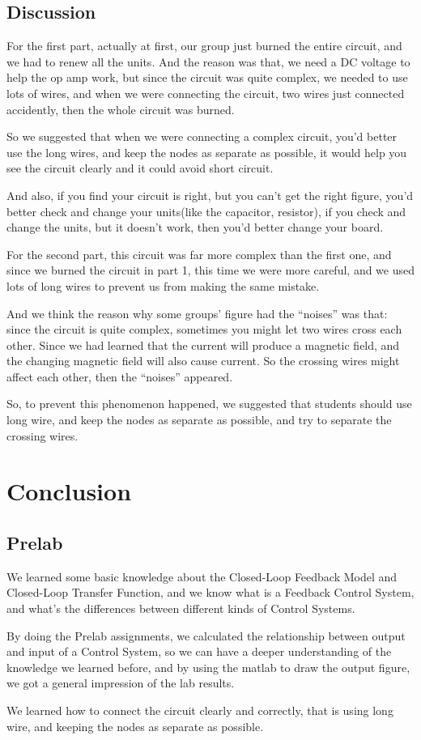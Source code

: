 \documentclass[12pt]{article}
\begin{document}
\subsection{Discussion}
For the first part, actually at first, our group just burned the entire circuit, and we had to renew all the units. And the reason was that, we need a DC voltage to help the op amp work, but since the circuit was quite complex, we needed to use lots of wires, and when we were connecting the circuit, two wires just connected accidently, then the whole circuit was burned.
\par So we suggested that when we were connecting a complex circuit, you’d better use the long wires, and keep the nodes as separate as possible, it would help you see the circuit clearly and it could avoid short circuit.
\par And also, if you find your circuit is right, but you can’t get the right figure, you’d better check and change your units(like the capacitor, resistor), if you check and change the units, but it doesn’t work, then you’d better change your board.
\par For the second part, this circuit was far more complex than the first one, and since we burned the circuit in part 1, this time we were more careful, and we used lots of long wires to prevent us from making the same mistake.
\par And we think the reason why some groups’ figure had the “noises” was that: since the circuit is quite complex, sometimes you might let two wires cross each other. Since we had learned that the current will produce a magnetic field, and the changing magnetic field will also cause current. So the crossing wires might affect each other, then the “noises” appeared.
\par So, to prevent this phenomenon happened, we suggested that students should use long wire, and keep the nodes as separate as possible, and try to separate the crossing wires.
\section{Conclusion}
\subsection{Prelab}
We learned some basic knowledge about the Closed-Loop Feedback Model and Closed-Loop Transfer Function, and we know what is a Feedback Control System, and what’s the differences between different kinds of Control Systems.
\par By doing the Prelab assignments, we calculated the relationship between output and input of a Control System, so we can have a deeper understanding of the knowledge we learned before, and by using the matlab to draw the output figure, we got a general impression of the lab results.
\par We learned how to connect the circuit clearly and correctly, that is using long wire, and keeping the nodes as separate as possible.
\end{document}
